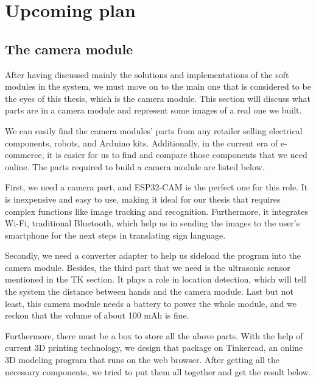 \chapter{Upcoming plan}

\section{The camera module}

After having discussed mainly the solutions and implementations of the soft modules in the system, we must move on to the main one that is considered to be the eyes of this thesis, which is the camera module. This section will discuss what parts are in a camera module and represent some images of a real one we built.

We can easily find the camera modules' parts from any retailer selling electrical components, robots, and Arduino kits. Additionally, in the current era of e-commerce, it is easier for us to find and compare those components that we need online. The parts required to build a camera module are listed below.

First, we need a camera part, and ESP32-CAM is the perfect one for this role. It is inexpensive and easy to use, making it ideal for our thesis that requires complex functions like image tracking and recognition. Furthermore, it integrates Wi-Fi, traditional Bluetooth, which help us in sending the images to the user's smartphone for the next steps in translating sign language.

Secondly, we need a converter adapter to help us sideload the program into the camera module. Besides, the third part that we need is the ultrasonic sensor mentioned in the TK section. It plays a role in location detection, which will tell the system the distance between hands and the camera module. Last but not least, this camera module needs a battery to power the whole module, and we reckon that the volume of about 100 mAh is fine.

Furthermore, there must be a box to store all the above parts. With the help of current 3D printing technology, we design that package on Tinkercad, an online 3D modeling program that runs on the web browser. After getting all the necessary components, we tried to put them all together and get the result below.

